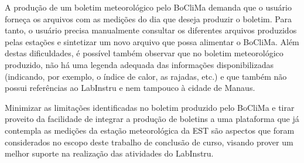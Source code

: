 A produção de um boletim meteorológico pelo BoCliMa demanda que o usuário forneça os arquivos com as medições do dia que deseja produzir o boletim. Para tanto, o usuário precisa manualmente consultar os diferentes arquivos produzidos pelas estações e sintetizar um novo arquivo que possa alimentar o BoCliMa. Além destas dificuldades, é possível também observar que no boletim meteorológico produzido, não há uma legenda adequada das informações disponibilizadas (indicando, por exemplo, o índice de calor, as rajadas, etc.) e que também não possui referências ao LabInstru e nem tampouco à cidade de Manaus.

Minimizar as limitações identificadas no boletim produzido pelo BoCliMa e tirar proveito da facilidade de integrar a produção de boletins a uma plataforma que já contempla as medições da estação meteorológica da EST são aspectos que foram considerados no escopo deste trabalho de conclusão de curso, visando prover um melhor suporte na realização das atividades do LabInstru.
